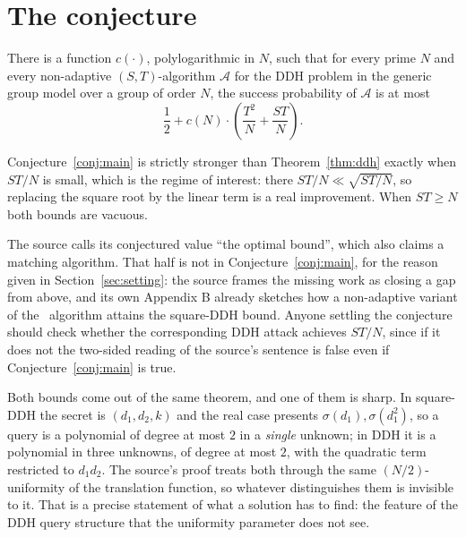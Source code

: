 \documentclass{aicr-conjecture}
\newcommand{\Adv}{\mathcal{A}}
\begin{document}
\section{The conjecture}\label{sec:conjectures}

\begin{conjecture}\label{conj:main}
There is a function $c(\cdot)$, polylogarithmic in $N$, such that for
every prime $N$ and every non-adaptive $(S,T)$-algorithm $\Adv$ for the
DDH problem in the generic group model over a group of order $N$, the
success probability of $\Adv$ is at most
\[
  \frac{1}{2}
  + c(N) \cdot \left( \frac{T^{2}}{N} + \frac{S T}{N} \right).
\]
\end{conjecture}

\begin{remark}
Conjecture~\ref{conj:main} is strictly stronger than
Theorem~\ref{thm:ddh} exactly when $ST/N$ is small, which is the
regime of interest: there $ST/N \ll \sqrt{ST/N}$, so replacing the
square root by the linear term is a real improvement. When $ST \ge N$
both bounds are vacuous.
\end{remark}

\begin{remark}\label{rem:lower}
The source calls its conjectured value ``the optimal bound'', which
also claims a matching algorithm. That half is not in
Conjecture~\ref{conj:main}, for the reason given in
Section~\ref{sec:setting}: the source frames the missing work as
closing a gap from above, and its own Appendix B already sketches how a
non-adaptive variant of the~\cite{CK18} algorithm attains the
square-DDH bound. Anyone settling the conjecture should check whether
the corresponding DDH attack achieves $ST/N$, since if it does not the
two-sided reading of the source's sentence is false even if
Conjecture~\ref{conj:main} is true.
\end{remark}

\begin{remark}
Both bounds come out of the same theorem, and one of them is sharp. In
square-DDH the secret is $(d_{1}, d_{2}, k)$ and the real case presents
$\sigma(d_{1}), \sigma(d_{1}^{2})$, so a query is a polynomial of
degree at most $2$ in a \emph{single} unknown; in DDH it is a
polynomial in three unknowns, of degree at most $2$, with the quadratic
term restricted to $d_{1}d_{2}$. The source's proof treats both through
the same $(N/2)$-uniformity of the translation function, so whatever
distinguishes them is invisible to it. That is a precise statement of
what a solution has to find: the feature of the DDH query structure
that the uniformity parameter does not see.
\end{remark}
\end{document}
